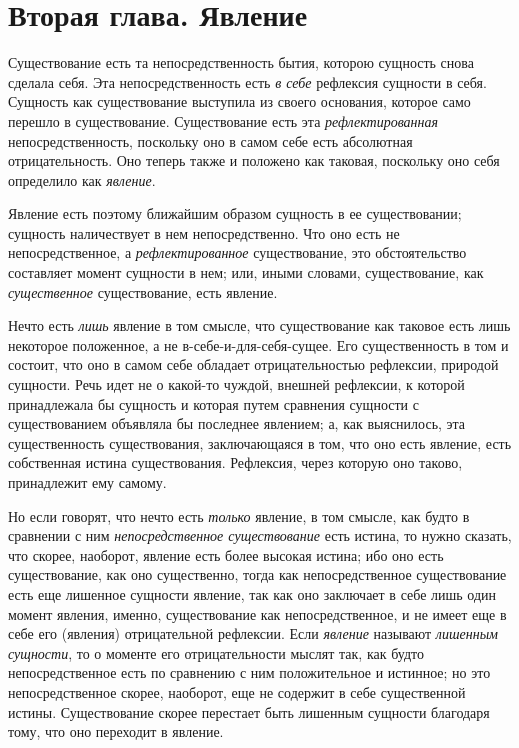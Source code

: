 \chapter[{\em Вторая глава} Явление]{Вторая глава. Явление}

Существование есть та непосредственность бытия,
которою сущность снова сделала себя. Эта непосредственность есть
{\em в себе} рефлексия сущности в себя. Сущность как
существование выступила из своего основания, которое само перешло в
существование. Существование есть эта
{\em рефлектированная} непосредственность, поскольку
оно в самом себе есть абсолютная отрицательность. Оно теперь также и
положено как таковая, поскольку оно себя определило как
{\em явление}.

Явление есть поэтому ближайшим образом сущность в ее существовании; сущность
наличествует в нем непосредственно. Что оно есть не непосредственное, а
{\em рефлектированное} существование, это
обстоятельство составляет момент сущности в нем; или, иными словами,
существование, как {\em существенное} существование,
есть явление.

Нечто есть {\em лишь} явление в том смысле, что
существование как таковое есть лишь некоторое положенное, а не
в-себе-и-для-себя-сущее. Его существенность в том и состоит, что оно в
самом себе обладает отрицательностью рефлексии, природой сущности. Речь
идет не о какой-то чуждой, внешней рефлексии, к которой принадлежала бы
сущность и которая путем сравнения сущности с существованием объявляла бы
последнее явлением; а, как выяснилось, эта существенность существования,
заключающаяся в том, что оно есть явление, есть собственная истина
существования. Рефлексия, через которую оно таково, принадлежит ему самому.

Но если говорят, что нечто есть {\em только} явление, в
том смысле, как будто в сравнении с ним
{\em непосредственное существование} есть истина, то
нужно сказать, что скорее, наоборот, явление есть более высокая истина; ибо
оно есть существование, как оно существенно, тогда как непосредственное
существование есть еще лишенное сущности явление, так как оно заключает в
себе лишь один момент явления, именно, существование как непосредственное,
и не имеет еще в себе его (явления) отрицательной рефлексии. Если
{\em явление} называют
{\em лишенным сущности}, то о моменте его
отрицательности мыслят так, как будто непосредственное есть по сравнению с
ним положительное и истинное; но это непосредственное скорее, наоборот, еще
не содержит в себе существенной истины. Существование скорее перестает быть
лишенным сущности благодаря тому, что оно переходит в явление.

